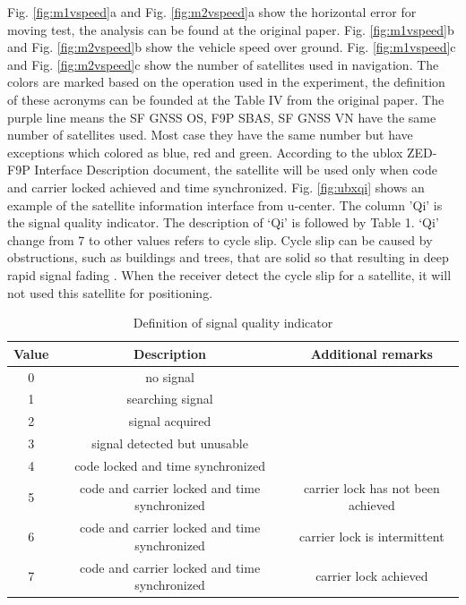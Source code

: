 \documentclass[letterpaper, 10 pt,onecolumn]{article}
\begin{document}
	Fig. \ref{fig:m1vspeed}a and Fig. \ref{fig:m2vspeed}a show the horizontal error for moving test, the analysis can be found at the original paper. Fig. \ref{fig:m1vspeed}b and Fig. \ref{fig:m2vspeed}b show the vehicle speed over ground. Fig. \ref{fig:m1vspeed}c and Fig. \ref{fig:m2vspeed}c show the number of satellites used in navigation. The colors are marked based on the operation used in the experiment, the definition of these acronyms can be founded at the Table IV from the original paper. The purple line means the SF GNSS OS, F9P SBAS, SF GNSS VN have the same number of satellites used. Most case they have the same number but have exceptions which colored as blue, red and green. According to the ublox ZED-F9P Interface Description document, the satellite will be used only when code and carrier locked achieved and time synchronized. Fig. \ref{fig:ubxqi} shows an example of the satellite information interface from u-center. The column 'Qi' is the signal quality indicator. The description of `Qi' is followed by Table 1. `Qi' change from 7 to other values refers to cycle slip. Cycle slip can be caused by obstructions, such as buildings and trees, that are solid so that resulting in deep rapid signal fading \cite{sennott1992use}. When the receiver detect the cycle slip for a satellite, it will not used this satellite for positioning.
	
	\begin{table}[H]
		\centering
		\begin{tabular}{|c|c|c|}
			\hline
			Value & Description                                   & Additional remarks                 \\ \hline
			0     & no signal                                     &                                    \\ \hline
			1     & searching signal                              &                                    \\ \hline
			2     & signal acquired                               &                                    \\ \hline
			3     & signal detected but unusable                  &                                    \\ \hline
			4     & code locked and time synchronized             &                                    \\ \hline
			5     & code and carrier locked and time synchronized & carrier lock has not been achieved \\ \hline
			6     & code and carrier locked and time synchronized & carrier lock is intermittent       \\ \hline
			7     & code and carrier locked and time synchronized & carrier lock achieved              \\ \hline
		\end{tabular}
		\label{tab:qi}
		\caption{Definition of signal quality indicator}
	\end{table}
	
\end{document}
